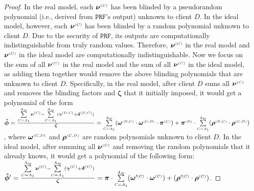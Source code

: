 \begin{proof}
 
 In the real model, each $\bm\nu^{\scriptscriptstyle (C)}$ has been blinded by a pseudorandom polynomial (i.e., derived from $\mathtt{PRF}$'s output) unknown to client $D$. In the ideal model, however, each $ {\bm\nu}^{\scriptscriptstyle (C)}$ has been blinded by a random polynomial unknown to client $D$. Due to the security of $\mathtt{PRF}$,  its outputs are computationally indistinguishable from truly random values.  Therefore, ${\bm\nu}^{\scriptscriptstyle (C)}$ in the real model and $ {\bm\nu}^{\scriptscriptstyle (C)}$ in the ideal model are computationally indistinguishable. Now we focus on the sum of all ${\bm\nu}^{\scriptscriptstyle (C)}$ in the real model and the sum of all $ {\bm\nu}^{\scriptscriptstyle (C)}$ in the ideal model, as adding them together would remove the above blinding polynomials that are unknown to client $D$.  Specifically, in the real model, after client $D$ sums all  ${\bm\nu}^{\scriptscriptstyle (C)}$ and removes the blinding factors and $\bm\zeta$ that it initially imposed, it would get a polynomial of the  form $\bm{\hat\phi}= \frac{ \sum\limits^{ \scriptscriptstyle {   A}_{ \scriptscriptstyle {   m}}}_{  \scriptscriptstyle {  {C }= }  \scriptscriptstyle {   A}_{ \scriptscriptstyle {  1}}}\bm\nu^{ \scriptscriptstyle {  {(C)}} }-\sum\limits^{ \scriptscriptstyle {   A}_{ \scriptscriptstyle {   m}}}_{  \scriptscriptstyle {  {C }= }  \scriptscriptstyle {   A}_{ \scriptscriptstyle {  1}}}(\bm\gamma^{ \scriptscriptstyle {  {(D,C)}}} + \bm\delta^{ \scriptscriptstyle {  {(D,C)}}})}{\bm\zeta}= \sum\limits^{ \scriptscriptstyle {   A}_{ \scriptscriptstyle {   m}}}_{ \scriptscriptstyle {  {C }= }  \scriptscriptstyle {   A}_{ \scriptscriptstyle {  1}}}(\bm\omega^{ \scriptscriptstyle {  {(D,C)}}} \cdot \bm\omega^{ \scriptscriptstyle {  {(C,D)}}}\cdot \bm\pi^{ \scriptscriptstyle {  (C)}}) +\bm\pi^{ \scriptscriptstyle {  {(D)}}}\cdot\sum\limits^{ \scriptscriptstyle {   A}_{ \scriptscriptstyle {   m}}}_{ \scriptscriptstyle {  {C }= }  \scriptscriptstyle {   A}_{ \scriptscriptstyle {  1}}}(\bm\rho^{ \scriptscriptstyle {  {(D,C)}}} \cdot \bm\rho^{ \scriptscriptstyle {  {(C,D)}}}) $, where $\bm\omega^{ \scriptscriptstyle {  {(C,D)}}}$ and $\bm\rho^{ \scriptscriptstyle {  {(C,D)}}}$ are random polynomials unknown to client $D$. 
 In the ideal model, after summing all $ {\bm\nu}^{\scriptscriptstyle (C)}$ and removing the random polynomials that it already knows, it would get a polynomial of the following form: 
 $\bm{\hat\phi}'= \frac{\sum\limits^{ \scriptscriptstyle {   A}_{ \scriptscriptstyle {   m}}}_{  \scriptscriptstyle {  {C }= }  \scriptscriptstyle {   A}_{ \scriptscriptstyle {  1}}} {\bm\nu}^{\scriptscriptstyle(C)}-\sum\limits^{ \scriptscriptstyle {   A}_{ \scriptscriptstyle {   m}}}_{  \scriptscriptstyle {  {C }= }  \scriptscriptstyle {   A}_{ \scriptscriptstyle {  1}}}( {\bm\gamma}^{\scriptscriptstyle(C)} +  {\bm\delta}^{\scriptscriptstyle(C)})}{ {\bm\zeta}}=  {\bm\pi}\cdot\sum\limits^{ \scriptscriptstyle {   A}_{ \scriptscriptstyle {   m}}}_{ \scriptscriptstyle {  {C }= }  \scriptscriptstyle {   A}_{ \scriptscriptstyle {  1}}}( {\bm\omega}'^{\scriptscriptstyle(C)} \cdot  {\bm\omega}^{\scriptscriptstyle(C)})+( {\bm\rho}'^{\scriptscriptstyle(C)} \cdot  {\bm\rho}^{\scriptscriptstyle(C)})  $.  
 

\end{proof}
